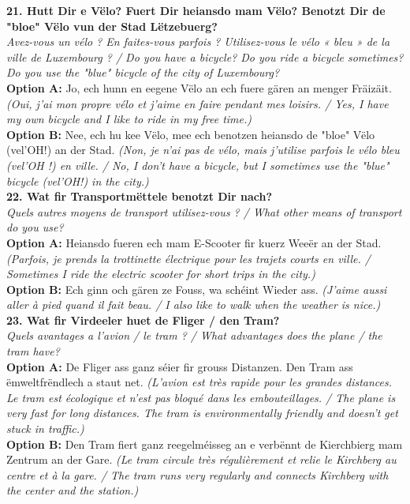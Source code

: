 \noindent\textbf{21. Hutt Dir e Vëlo? Fuert Dir heiansdo mam Vëlo? Benotzt Dir de "bloe" Vëlo vun der Stad Lëtzebuerg?}\\
\textit{Avez-vous un vélo ? En faites-vous parfois ? Utilisez-vous le vélo « bleu » de la ville de Luxembourg ? / Do you have a bicycle? Do you ride a bicycle sometimes? Do you use the "blue" bicycle of the city of Luxembourg?}\\
\textbf{Option A:} Jo, ech hunn en eegene Vëlo an ech fuere gären an menger Fräizäit. \textit{(Oui, j'ai mon propre vélo et j'aime en faire pendant mes loisirs. / Yes, I have my own bicycle and I like to ride in my free time.)}\\
\textbf{Option B:} Nee, ech hu kee Vëlo, mee ech benotzen heiansdo de "bloe" Vëlo (vel'OH!) an der Stad. \textit{(Non, je n'ai pas de vélo, mais j'utilise parfois le vélo bleu (vel'OH !) en ville. / No, I don't have a bicycle, but I sometimes use the "blue" bicycle (vel'OH!) in the city.)}\\[1em]

\noindent\textbf{22. Wat fir Transportmëttele benotzt Dir nach?}\\
\textit{Quels autres moyens de transport utilisez-vous ? / What other means of transport do you use?}\\
\textbf{Option A:} Heiansdo fueren ech mam E-Scooter fir kuerz Weeër an der Stad. \textit{(Parfois, je prends la trottinette électrique pour les trajets courts en ville. / Sometimes I ride the electric scooter for short trips in the city.)}\\
\textbf{Option B:} Ech ginn och gären ze Fouss, wa schéint Wieder ass. \textit{(J'aime aussi aller à pied quand il fait beau. / I also like to walk when the weather is nice.)}\\[1em]

\noindent\textbf{23. Wat fir Virdeeler huet de Fliger / den Tram?}\\
\textit{Quels avantages a l'avion / le tram ? / What advantages does the plane / the tram have?}\\
\textbf{Option A:} De Fliger ass ganz séier fir grouss Distanzen. Den Tram ass ëmweltfrëndlech a staut net. \textit{(L'avion est très rapide pour les grandes distances. Le tram est écologique et n'est pas bloqué dans les embouteillages. / The plane is very fast for long distances. The tram is environmentally friendly and doesn't get stuck in traffic.)}\\
\textbf{Option B:} Den Tram fiert ganz reegelméisseg an e verbënnt de Kierchbierg mam Zentrum an der Gare. \textit{(Le tram circule très régulièrement et relie le Kirchberg au centre et à la gare. / The tram runs very regularly and connects Kirchberg with the center and the station.)}\\[1em]


